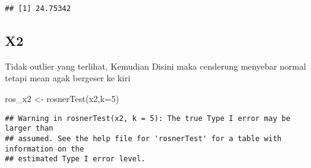 \documentclass[
]{article}
\newenvironment{Shaded}{\begin{snugshade}}{\end{snugshade}}
\newcommand{\AttributeTok}[1]{\textcolor[rgb]{0.77,0.63,0.00}{#1}}
\newcommand{\ConstantTok}[1]{\textcolor[rgb]{0.00,0.00,0.00}{#1}}
\newcommand{\DecValTok}[1]{\textcolor[rgb]{0.00,0.00,0.81}{#1}}
\newcommand{\FunctionTok}[1]{\textcolor[rgb]{0.00,0.00,0.00}{#1}}
\newcommand{\NormalTok}[1]{#1}
\newcommand{\OtherTok}[1]{\textcolor[rgb]{0.56,0.35,0.01}{#1}}
\newcommand{\SpecialCharTok}[1]{\textcolor[rgb]{0.00,0.00,0.00}{#1}}
\newcommand{\StringTok}[1]{\textcolor[rgb]{0.31,0.60,0.02}{#1}}
\begin{document}
\begin{Shaded}
\end{Shaded}

\begin{verbatim}
## [1] 24.75342
\end{verbatim}

\hypertarget{x2}{%
\subsection{X2}\label{x2}}

Tidak outlier yang terlihat, Kemudian Disini maka cenderung menyebar
normal tetapi mean agak bergeser ke kiri

\begin{Shaded}
\begin{Highlighting}[]
\NormalTok{ros\_x2 }\OtherTok{\textless{}{-}} \FunctionTok{rosnerTest}\NormalTok{(x2,}\AttributeTok{k=}\DecValTok{5}\NormalTok{)}
\end{Highlighting}
\end{Shaded}

\begin{verbatim}
## Warning in rosnerTest(x2, k = 5): The true Type I error may be larger than
## assumed. See the help file for 'rosnerTest' for a table with information on the
## estimated Type I error level.
\end{verbatim}

\begin{Shaded}
\end{Shaded}
\end{document}
